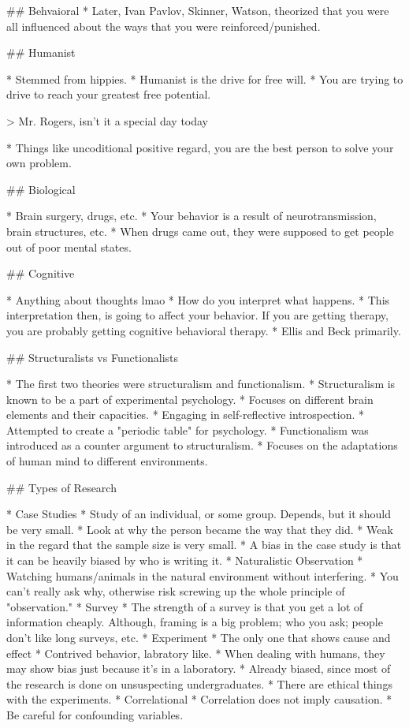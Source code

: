 \documentclass{article}
\begin{document}
\begin{markdown}
## Behvaioral
* Later, Ivan Pavlov, Skinner, Watson, theorized that you were all influenced about the ways that you were reinforced/punished.

## Humanist

* Stemmed from hippies.
* Humanist is the drive for free will.
* You are trying to drive to reach your greatest free potential.

> Mr. Rogers, isn't it a special day today

* Things like uncoditional positive regard, you are the best person to solve your own problem.

## Biological

* Brain surgery, drugs, etc.
* Your behavior is a result of neurotransmission, brain structures, etc.
* When drugs came out, they were supposed to get people out of poor mental states.

## Cognitive

* Anything about thoughts lmao
* How do you interpret what happens.
* This interpretation then, is going to affect your behavior. If you are getting therapy, you are probably getting cognitive behavioral therapy.
* Ellis and Beck primarily.

## Structuralists vs Functionalists

* The first two theories were structuralism and functionalism.
* Structuralism is known to be a part of experimental psychology.
	* Focuses on different brain elements and their capacities.
	* Engaging in self-reflective introspection.
	* Attempted to create a "periodic table" for psychology.
* Functionalism was introduced as a counter argument to structuralism.
	* Focuses on the adaptations of human mind to different environments.

## Types of Research

* Case Studies
	* Study of an individual, or some group. Depends, but it should be very small.
	* Look at why the person became the way that they did.
	* Weak in the regard that the sample size is very small.
	* A bias in the case study is that it can be heavily biased by who is writing it.
* Naturalistic Observation
	* Watching humans/animals in the natural environment without interfering.
	* You can't really ask why, otherwise risk screwing up the whole principle of "observation."
* Survey
	* The strength of a survey is that you get a lot of information cheaply. Although, framing is a big problem; who you ask; people don't like long surveys, etc.
* Experiment
	* The only one that shows cause and effect
	* Contrived behavior, labratory like.
	* When dealing with humans, they may show bias just because it's in a laboratory.
	* Already biased, since most of the research is done on unsuspecting undergraduates.
	* There are ethical things with the experiments.
* Correlational
	* Correlation does not imply causation.
	* Be careful for confounding variables.


\end{markdown}
\end{document}
